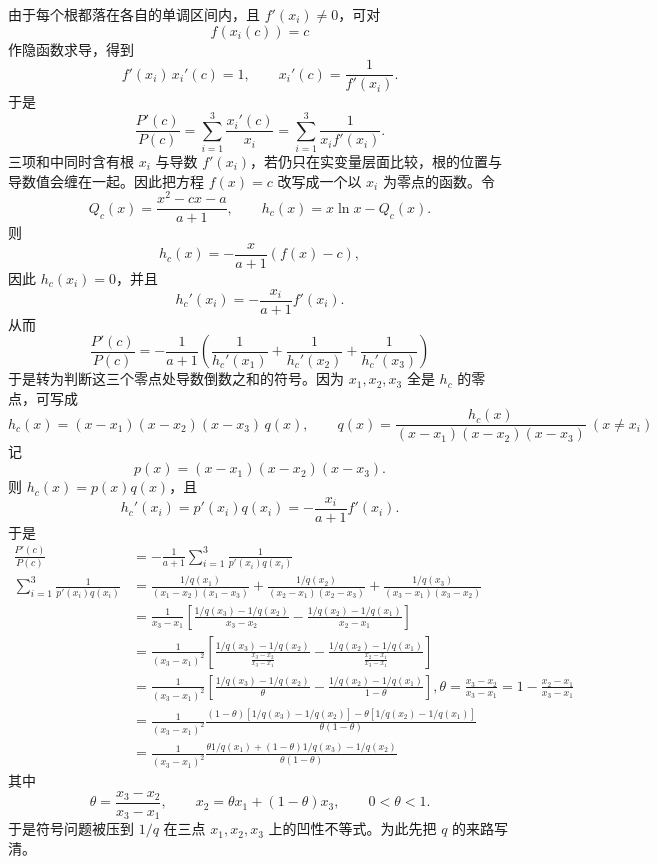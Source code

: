 \begin{solution}
由于每个根都落在各自的单调区间内，且 $f'(x_i)\neq 0$，可对
\[
f(x_i(c))=c
\]
作隐函数求导，得到
\[
f'(x_i)\,x_i'(c)=1,\qquad x_i'(c)=\frac{1}{f'(x_i)}.
\]
于是
\[
\frac{P'(c)}{P(c)}=\sum_{i=1}^3\frac{x_i'(c)}{x_i}=\sum_{i=1}^3\frac{1}{x_i f'(x_i)}.
\]
三项和中同时含有根 $x_i$ 与导数 $f'(x_i)$，若仍只在实变量层面比较，根的位置与导数值会缠在一起。因此把方程 $f(x)=c$ 改写成一个以 $x_i$ 为零点的函数。令
\[
Q_c(x)=\frac{x^2-cx-a}{a+1},\qquad h_c(x)=x\ln x-Q_c(x).
\]
则
\[
h_c(x)=-\frac{x}{a+1}(f(x)-c),
\]
因此 $h_c(x_i)=0$，并且
\[
h_c'(x_i)=-\frac{x_i}{a+1}f'(x_i).
\]
从而
\[\frac{P'(c)}{P(c)}=-\dfrac{1}{a+1}\left(\frac{1}{h_c'(x_1)}+\frac{1}{h_c'(x_2)}+\frac{1}{h_c'(x_3)}\right)\]
于是转为判断这三个零点处导数倒数之和的符号。因为 $x_1,x_2,x_3$ 全是 $h_c$ 的零点，可写成
\[h_c(x)=(x-x_1)(x-x_2)(x-x_3)\,q(x),\qquad q(x)=\frac{h_c(x)}{(x-x_1)(x-x_2)(x-x_3)}\ (x\neq x_i)\]
记
\[
p(x)=(x-x_1)(x-x_2)(x-x_3).
\]
则 $h_c(x)=p(x)q(x)$，且
\[
h_c'(x_i)=p'(x_i)q(x_i)=-\frac{x_i}{a+1}f'(x_i).
\]
于是
\begin{align*}
\frac{P'(c)}{P(c)}&=-\frac{1}{a+1}\sum_{i=1}^3\frac{1}{p'(x_i)q(x_i)}\\
\sum_{i=1}^3\frac{1}{p'(x_i)q(x_i)}&= \frac{1/q(x_1)}{(x_1-x_2)(x_1-x_3)} + \frac{1/q(x_2)}{(x_2-x_1)(x_2-x_3)} + \frac{1/q(x_3)}{(x_3-x_1)(x_3-x_2)}\\
&= \frac{1}{x_3 - x_1} \left[ \frac{1/q(x_3) - 1/q(x_2)}{x_3 - x_2} - \frac{1/q(x_2) - 1/q(x_1)}{x_2 - x_1} \right]\\
&=  \frac{1}{(x_3 - x_1)^2}\left[\frac{1/q(x_3) - 1/q(x_2)}{\frac{x_3 - x_2}{x_3-x_1}} - \frac{1/q(x_2) - 1/q(x_1)}{\frac{x_2 - x_1}{x_3-x_1}}\right]\\
&= \frac{1}{(x_3 - x_1)^2} \left[ \frac{1/q(x_3) - 1/q(x_2)}{\theta} - \frac{1/q(x_2) - 1/q(x_1)}{1-\theta} \right],\theta = \frac{x_3 - x_2}{x_3 - x_1}=1 -  \frac{x_2 - x_1}{x_3 - x_1}\\
&=\frac{1}{(x_3-x_1)^2} \frac{(1-\theta)[1/q(x_3) - 1/q(x_2)] - \theta[1/q(x_2) - 1/q(x_1)]}{\theta(1-\theta)}\\
&=\frac{1}{(x_3-x_1)^2} \frac{ \theta 1/q(x_1) + (1-\theta)1/q(x_3) - 1/q(x_2)}{\theta(1-\theta)}
\end{align*}
其中
\[
\theta=\frac{x_3-x_2}{x_3-x_1},\qquad x_2=\theta x_1+(1-\theta)x_3,\qquad 0<\theta<1.
\]
于是符号问题被压到 $1/q$ 在三点 $x_1,x_2,x_3$ 上的凹性不等式。为此先把 $q$ 的来路写清。


\end{solution}
